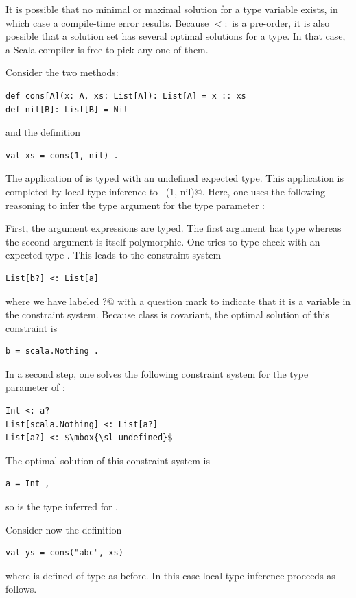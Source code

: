 It is possible that no minimal or maximal solution for a type variable
exists, in which case a compile-time error results. Because $<:$ is a
pre-order, it is also possible that a solution set has several optimal
solutions for a type. In that case, a Scala compiler is free to pick
any one of them.

\example Consider the two methods:
\begin{lstlisting}
def cons[A](x: A, xs: List[A]): List[A] = x :: xs
def nil[B]: List[B] = Nil
\end{lstlisting}
and the definition
\begin{lstlisting}
val xs = cons(1, nil) .
\end{lstlisting}
The application of  is typed with an undefined expected
type. This application is completed by local type inference to 
~\lstinline@cons[Int](1, nil)@. 
Here, one uses the following
reasoning to infer the type argument \lstinline@Int@ for the type
parameter :

First, the argument expressions are typed. The first argument 
has type  whereas the second argument \lstinline@nil@ is
itself polymorphic. One tries to type-check \lstinline@nil@ with an
expected type . This leads to the constraint system
\begin{lstlisting}
List[b?] <: List[a]
\end{lstlisting}
where we have labeled \lstinline@b?@ with a question mark to indicate
that it is a variable in the constraint system.
Because class \lstinline@List@ is covariant, the optimal
solution of this constraint is
\begin{lstlisting}
b = scala.Nothing .
\end{lstlisting}

In a second step, one solves the following constraint system for
the type parameter  of :
\begin{lstlisting}
Int <: a?
List[scala.Nothing] <: List[a?]
List[a?] <: $\mbox{\sl undefined}$
\end{lstlisting}
The optimal solution of this constraint system is
\begin{lstlisting}
a = Int ,
\end{lstlisting}
so  is the type inferred for .

\example Consider now the definition  
\begin{lstlisting}
val ys = cons("abc", xs)
\end{lstlisting}
where  is defined of type  as before.
In this case local type inference proceeds as follows.

